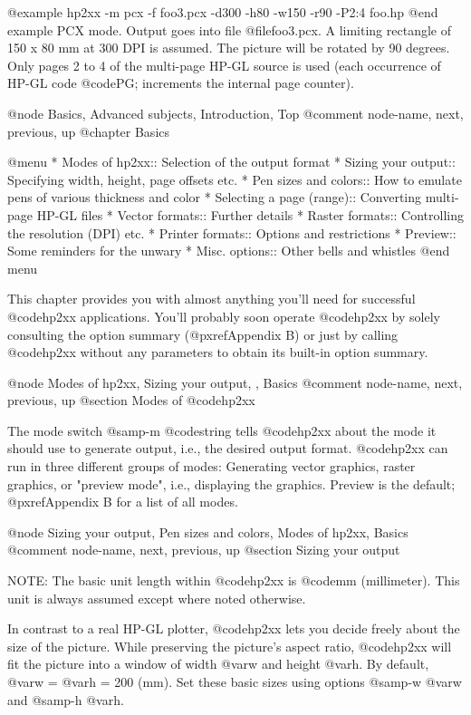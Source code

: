 @example
hp2xx -m pcx -f foo3.pcx -d300 -h80 -w150 -r90 -P2:4  foo.hp
@end example
PCX mode. Output goes into file @file{foo3.pcx}. A limiting rectangle
of 150 x 80 mm at 300 DPI is assumed. The picture will be rotated by
90 degrees. Only pages 2 to 4 of the multi-page HP-GL source is used (each
occurrence of HP-GL code @code{PG;} increments the internal page counter).



@node Basics, Advanced subjects, Introduction, Top
@comment  node-name,  next,  previous,  up
@chapter Basics

@menu
* Modes of hp2xx::           Selection of the output format
* Sizing your output::       Specifying width, height, page offsets etc.
* Pen sizes and colors::     How to emulate pens of various thickness and color
* Selecting a page (range):: Converting multi-page HP-GL files
* Vector formats::           Further details
* Raster formats::           Controlling the resolution (DPI) etc.
* Printer formats::          Options and restrictions
* Preview::                  Some reminders for the unwary
* Misc. options::            Other bells and whistles
@end menu

This chapter provides you with almost anything you'll need for successful
@code{hp2xx} applications. You'll probably soon operate @code{hp2xx}
by solely consulting the option summary (@pxref{Appendix B}) or just
by calling @code{hp2xx} without any parameters to obtain its built-in
option summary.


@node Modes of hp2xx, Sizing your output, , Basics
@comment  node-name,  next,  previous,  up
@section Modes of @code{hp2xx}

The mode switch @samp{-m @code{string}} tells @code{hp2xx} about the mode it
should use to generate output, i.e., the desired output format. @code{hp2xx}
can run in three different groups of modes: Generating vector graphics,
raster graphics, or "preview mode", i.e., displaying the graphics.
Preview is the default; @pxref{Appendix B} for a list of all modes.



@node Sizing your output, Pen sizes and colors, Modes of hp2xx, Basics
@comment  node-name,  next,  previous,  up
@section Sizing your output

NOTE: The basic unit length within @code{hp2xx} is @code{mm} (millimeter).
This unit is always assumed except where noted otherwise.

In contrast to a real HP-GL plotter, @code{hp2xx} lets you decide freely
about the size of the picture. While preserving the picture's aspect ratio,
@code{hp2xx} will fit the picture into a window of width @var{w} and
height @var{h}. By default, @var{w} = @var{h} = 200 (mm). Set these basic
sizes using options @samp{-w @var{w}} and @samp{-h @var{h}}.

